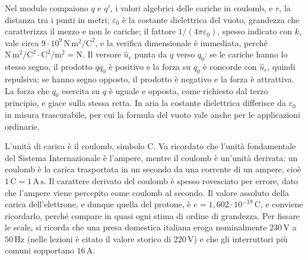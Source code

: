 \documentclass[11pt,a4paper]{article}
\newcommand{\epz}{\varepsilon_0}
\newcommand{\uv}{\hat{u}}
\begin{document}
Nel modulo compaiono $q$ e $q'$, i valori algebrici delle cariche in coulomb, e $r$, la distanza tra i punti in metri; $\epz$ è la costante dielettrica del vuoto, grandezza che caratterizza il mezzo e non le cariche; il fattore $1/(4\pi\epz)$, spesso indicato con $k$, vale circa $9\cdot 10^{9}\,\mathrm{N\,m^2/C^2}$, e la verifica dimensionale è immediata, perché $\mathrm{N\,m^2/C^2}\cdot\mathrm{C^2/m^2}=\mathrm{N}$. Il versore $\uv_r$ punta da $q$ verso $q_0$: se le cariche hanno lo stesso segno, il prodotto $qq_0$ è positivo e la forza su $q_0$ è concorde con $\uv_r$, quindi repulsiva; se hanno segno opposto, il prodotto è negativo e la forza è attrattiva. La forza che $q_0$ esercita su $q$ è uguale e opposta, come richiesto dal terzo principio, e giace sulla stessa retta. In aria la costante dielettrica differisce da $\epz$ in misura trascurabile, per cui la formula del vuoto vale anche per le applicazioni ordinarie.

L'unità di carica è il coulomb, simbolo $\mathrm{C}$. Va ricordato che l'unità fondamentale del Sistema Internazionale è l'ampere, mentre il coulomb è un'unità derivata: un coulomb è la carica trasportata in un secondo da una corrente di un ampere, cioè $1\,\mathrm{C}=1\,\mathrm{A\,s}$. Il carattere derivato del coulomb è spesso rovesciato per errore, dato che l'ampere viene percepito come coulomb al secondo. Il valore assoluto della carica dell'elettrone, e dunque quella del protone, è $e=1,602\cdot 10^{-19}\,\mathrm{C}$, e conviene ricordarlo, perché compare in quasi ogni stima di ordine di grandezza. Per fissare le scale, si ricorda che una presa domestica italiana eroga nominalmente $230\,\mathrm{V}$ a $50\,\mathrm{Hz}$ (nelle lezioni è citato il valore storico di $220\,\mathrm{V}$) e che gli interruttori più comuni sopportano $16\,\mathrm{A}$.
\end{document}
